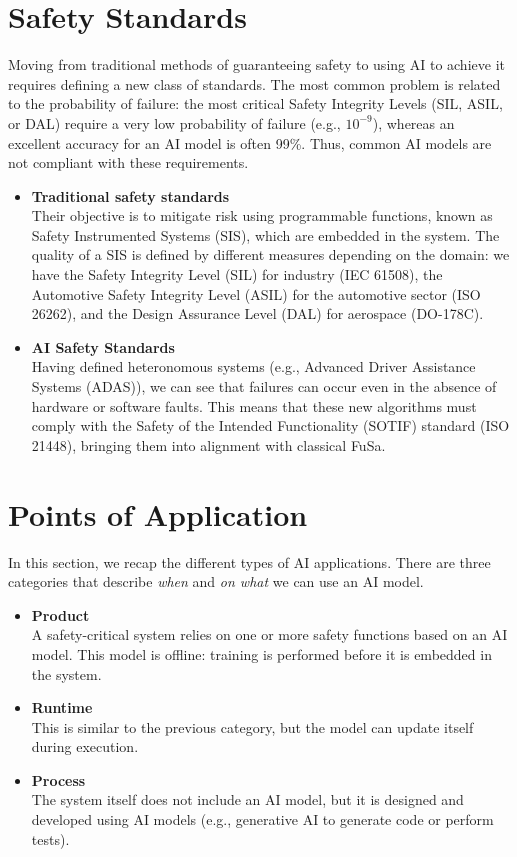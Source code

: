\section{Safety Standards}
\label{sec:standard}
Moving from traditional methods of guaranteeing safety to using AI to achieve it requires defining a new class of standards. The most common problem is related to the probability of failure: the most critical Safety Integrity Levels (SIL, ASIL, or DAL) require a very low probability of failure (e.g., $10^{-9}$), whereas an excellent accuracy for an AI model is often 99\%. Thus, common AI models are not compliant with these requirements.
\begin{itemize}
    \item \textbf{Traditional safety standards} \\
        Their objective is to mitigate risk using programmable functions, known as Safety Instrumented Systems (SIS), which are embedded in the system. The quality of a SIS is defined by different measures depending on the domain: we have the Safety Integrity Level (SIL) for industry (IEC 61508), the Automotive Safety Integrity Level (ASIL) for the automotive sector (ISO 26262), and the Design Assurance Level (DAL) for aerospace (DO-178C).
    \item \textbf{AI Safety Standards} \\
        Having defined heteronomous systems (e.g., Advanced Driver Assistance Systems (ADAS)), we can see that failures can occur even in the absence of hardware or software faults. This means that these new algorithms must comply with the Safety of the Intended Functionality (SOTIF) standard (ISO 21448), bringing them into alignment with classical FuSa.
\end{itemize}

\section{Points of Application}
\label{sec:application}
In this section, we recap the different types of AI applications. There are three categories that describe \textit{when} and \textit{on what} we can use an AI model.
\begin{itemize}
    \item \textbf{Product} \\
        A safety-critical system relies on one or more safety functions based on an AI model. This model is offline: training is performed before it is embedded in the system.
    \item \textbf{Runtime} \\
        This is similar to the previous category, but the model can update itself during execution.
    \item \textbf{Process} \\
        The system itself does not include an AI model, but it is designed and developed using AI models (e.g., generative AI to generate code or perform tests).
\end{itemize}

